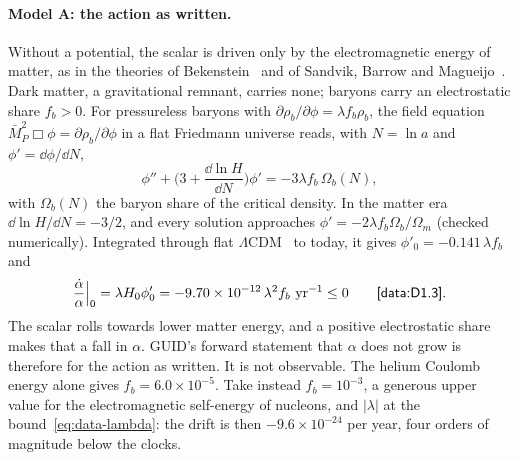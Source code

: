 \paragraph{Model A: the action as written.} Without a potential, the scalar is driven only by the electromagnetic energy of matter, as in the
theories of Bekenstein~\cite{bekenstein82} and of Sandvik, Barrow and Magueijo~\cite{bsbm}. Dark matter, a gravitational remnant, carries none;
baryons carry an electrostatic share $f_b>0$. For pressureless baryons with $\partial\rho_b/\partial\phi=\lambda f_b\rho_b$, the field equation
$\bar M_P^2\Box\phi=\partial\rho_b/\partial\phi$ in a flat Friedmann universe reads, with $N=\ln a$ and $\phi'=\dd\phi/\dd N$,
\begin{equation}\label{eq:data-modelA}
\phi''+\Big(3+\frac{\dd\ln H}{\dd N}\Big)\phi'=-3\lambda f_b\,\Omega_b(N),
\end{equation}
with $\Omega_b(N)$ the baryon share of the critical density. In the matter era $\dd\ln H/\dd N=-3/2$, and every solution approaches
$\phi'=-2\lambda f_b\Omega_b/\Omega_m$ (checked numerically). Integrated through flat $\Lambda$CDM~\cite{planck18} to today, it gives
$\phi'_0=-0.141\,\lambda f_b$ and
\begin{equation}\label{eq:data-driftA}
\frac{\dot\alpha}{\alpha}\Big|_0=\lambda H_0\phi'_0=-9.70\times10^{-12}\,\lambda^2f_b\ \mathrm{yr}^{-1}\le0\qquad\chk{data:D1.3}.
\end{equation}
The scalar rolls towards lower matter energy, and a positive electrostatic share makes that a fall in $\alpha$. GUID's forward statement that
$\alpha$ does not grow is therefore  for the action as written. It is not observable. The helium Coulomb energy alone gives
$f_b=6.0\times10^{-5}$. Take instead $f_b=10^{-3}$, a generous upper value for the electromagnetic self-energy of nucleons, and $|\lambda|$ at
the bound~\eqref{eq:data-lambda}: the drift is then $-9.6\times10^{-24}$ per year, four orders of magnitude below the clocks.

